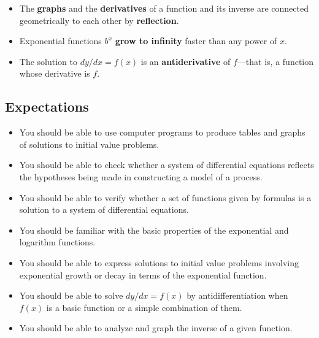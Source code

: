 \begin{itemize}
\item  The {\bf graphs} and the {\bf derivatives} of a function and its inverse are connected geometrically to each other by {\bf reflection}.  

\item  Exponential functions $b^{\displaystyle x}$ {\bf grow to infinity} faster than any power of $x$.

\item  The solution to $dy/dx = f(x)$ is an {\bf antiderivative} of $f$---that is, a function whose derivative is $f$.


\end{itemize}


\subsection{Expectations}
\label{subsec:expectations}

\begin{itemize}

\item  You should be able to use computer programs to produce tables and graphs of solutions to initial value problems.

\item  You should be able to check whether a system of differential equations reflects the hypotheses being made in constructing a model of a process.

\item  You should be able to verify whether a set of functions given by formulas is a solution to a system of differential equations.

\item  You should be familiar with the basic properties of the exponential and logarithm functions.  

\item  You should be able to express solutions to initial value problems involving exponential growth or decay in terms of the exponential function.

\item  You should be able to solve $dy/dx = f(x)$ by antidifferentiation when $f(x)$ is a basic function or a simple combination of them.  

\item  You should be able to analyze and graph the inverse of a given function.


\end{itemize}

\cleardoublepage